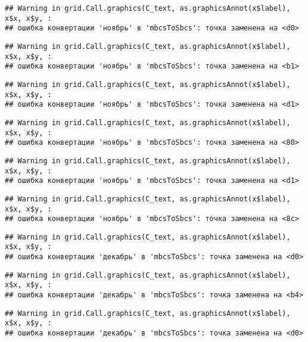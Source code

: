 \documentclass[
]{article}
\begin{document}
\begin{verbatim}
## Warning in grid.Call.graphics(C_text, as.graphicsAnnot(x$label), x$x, x$y, :
## ошибка конвертации 'ноябрь' в 'mbcsToSbcs': точка заменена на <d0>
\end{verbatim}

\begin{verbatim}
## Warning in grid.Call.graphics(C_text, as.graphicsAnnot(x$label), x$x, x$y, :
## ошибка конвертации 'ноябрь' в 'mbcsToSbcs': точка заменена на <b1>
\end{verbatim}

\begin{verbatim}
## Warning in grid.Call.graphics(C_text, as.graphicsAnnot(x$label), x$x, x$y, :
## ошибка конвертации 'ноябрь' в 'mbcsToSbcs': точка заменена на <d1>
\end{verbatim}

\begin{verbatim}
## Warning in grid.Call.graphics(C_text, as.graphicsAnnot(x$label), x$x, x$y, :
## ошибка конвертации 'ноябрь' в 'mbcsToSbcs': точка заменена на <80>
\end{verbatim}

\begin{verbatim}
## Warning in grid.Call.graphics(C_text, as.graphicsAnnot(x$label), x$x, x$y, :
## ошибка конвертации 'ноябрь' в 'mbcsToSbcs': точка заменена на <d1>
\end{verbatim}

\begin{verbatim}
## Warning in grid.Call.graphics(C_text, as.graphicsAnnot(x$label), x$x, x$y, :
## ошибка конвертации 'ноябрь' в 'mbcsToSbcs': точка заменена на <8c>
\end{verbatim}

\begin{verbatim}
## Warning in grid.Call.graphics(C_text, as.graphicsAnnot(x$label), x$x, x$y, :
## ошибка конвертации 'декабрь' в 'mbcsToSbcs': точка заменена на <d0>
\end{verbatim}

\begin{verbatim}
## Warning in grid.Call.graphics(C_text, as.graphicsAnnot(x$label), x$x, x$y, :
## ошибка конвертации 'декабрь' в 'mbcsToSbcs': точка заменена на <b4>
\end{verbatim}

\begin{verbatim}
## Warning in grid.Call.graphics(C_text, as.graphicsAnnot(x$label), x$x, x$y, :
## ошибка конвертации 'декабрь' в 'mbcsToSbcs': точка заменена на <d0>
\end{verbatim}
\end{document}
